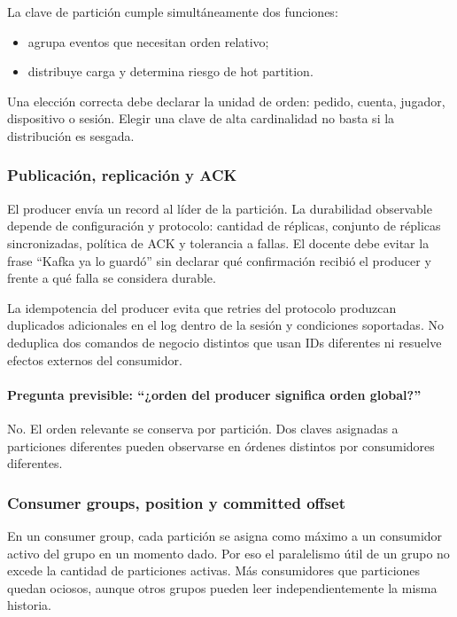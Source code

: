 \documentclass[variant=docente,cover=institutional,mode=screen]{ua-engineering-v6-article}
\begin{document}
La clave de partición cumple simultáneamente dos funciones:
\begin{itemize}
\item agrupa eventos que necesitan orden relativo;
\item distribuye carga y determina riesgo de hot partition.
\end{itemize}

Una elección correcta debe declarar la unidad de orden: pedido, cuenta, jugador, dispositivo o sesión. Elegir una clave de alta cardinalidad no basta si la distribución es sesgada.

\subsubsection{Publicación, replicación y ACK}

El producer envía un record al líder de la partición. La durabilidad observable depende de configuración y protocolo: cantidad de réplicas, conjunto de réplicas sincronizadas, política de ACK y tolerancia a fallas. El docente debe evitar la frase ``Kafka ya lo guardó'' sin declarar qué confirmación recibió el producer y frente a qué falla se considera durable.

La idempotencia del producer evita que retries del protocolo produzcan duplicados adicionales en el log dentro de la sesión y condiciones soportadas. No deduplica dos comandos de negocio distintos que usan IDs diferentes ni resuelve efectos externos del consumidor.

\paragraph{Pregunta previsible: ``¿orden del producer significa orden global?''}
No. El orden relevante se conserva por partición. Dos claves asignadas a particiones diferentes pueden observarse en órdenes distintos por consumidores diferentes.

\subsubsection{Consumer groups, position y committed offset}

En un consumer group, cada partición se asigna como máximo a un consumidor activo del grupo en un momento dado. Por eso el paralelismo útil de un grupo no excede la cantidad de particiones activas. Más consumidores que particiones quedan ociosos, aunque otros grupos pueden leer independientemente la misma historia.
\end{document}
